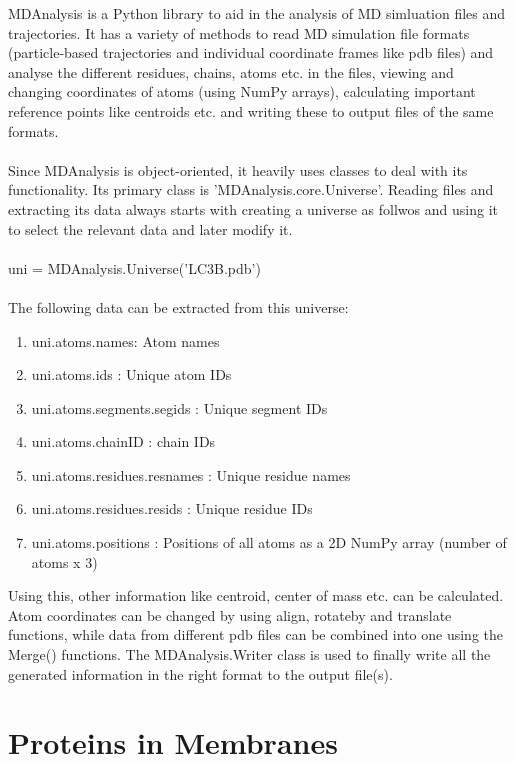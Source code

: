 \documentclass[12pt, a4paper]{report}
\begin{document}
MDAnalysis is a Python library to aid in the analysis of MD simluation files and trajectories. It has a variety of methods to read MD simulation file formats (particle-based trajectories and individual coordinate frames like pdb files) and analyse the different residues, chains, atoms etc. in the files, viewing and changing coordinates of atoms (using NumPy arrays), calculating important reference points like centroids etc. and writing these to output files of the same formats. 
\\~\\ 
Since MDAnalysis is object-oriented, it heavily uses classes to deal with its functionality. Its primary class is 'MDAnalysis.core.Universe'. Reading files and extracting its data always starts with creating a universe as follwos and using it to select the relevant data and later modify it. 
\\~\\ 
uni = MDAnalysis.Universe('LC3B.pdb') 
\\~\\ 
The following data can be extracted from this universe: 
\begin{enumerate}
    \item uni.atoms.names: Atom names 
    \item uni.atoms.ids : Unique atom IDs 
    \item uni.atoms.segments.segids : Unique segment IDs 
    \item uni.atoms.chainID : chain IDs
    \item uni.atoms.residues.resnames : Unique residue names 
    \item uni.atoms.residues.resids : Unique residue IDs 
    \item uni.atoms.positions : Positions of all atoms as a 2D NumPy array (number of atoms x 3) 
\end{enumerate} 

Using this, other information like centroid, center of mass etc. can be calculated. Atom coordinates can be changed by using align, rotateby and translate functions, while data from different pdb files can be combined into one using the Merge() functions. The MDAnalysis.Writer class is used to finally write all the generated information in the right format to the output file(s). 

\newpage
\section*{Proteins in Membranes} 
\end{document}
